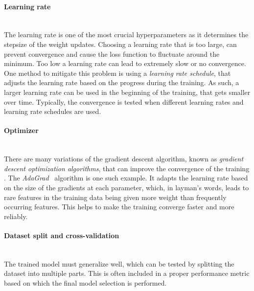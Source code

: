 \paragraph{Learning rate} \mbox{}\\
The learning rate is one of the most crucial hyperparameters as it determines the stepsize of the weight updates. Choosing a learning rate that is too large, can prevent convergence and cause the loss function to fluctuate around the minimum. Too low a learning rate can lead to extremely slow or no convergence. 
One method to mitigate this problem is using a \emph{learning rate schedule}, that adjusts the learning rate based on the progress during the training. As such, a larger learning rate can be used in the beginning of the training, that gets smaller over time.
Typically, the convergence is tested when different learning rates and learning rate schedules are used.


\paragraph{Optimizer}\mbox{}\\
There are many variations of the gradient descent algorithm, known as \emph{gradient descent optimization algorithms}, that can improve the convergence of the training . The \emph{AdaGrad}~ algorithm is one such example. It adapts the learning rate based on the size of the gradients at each parameter, which, in layman's words, leads to rare features in the training data being given more weight than frequently occurring features. This helps to make the training converge faster and more reliably.


\paragraph{Dataset split and cross-validation}\mbox{}\\
The trained model must generalize well, which can be tested by splitting the dataset into multiple parts. 
This is often included in a proper performance metric based on which the final model selection is performed. 

